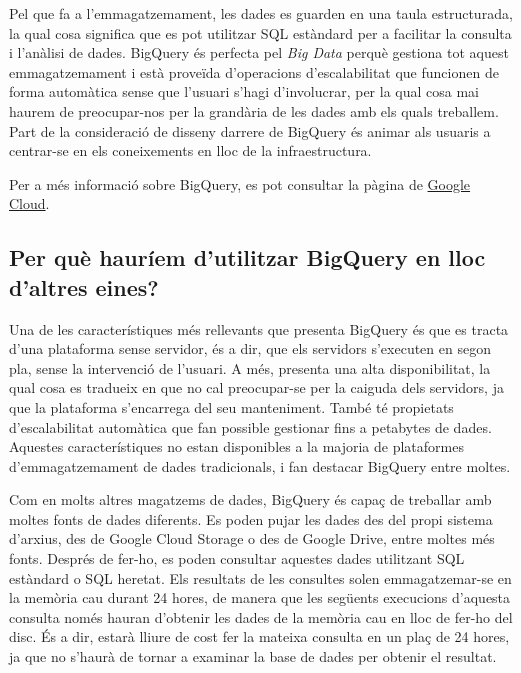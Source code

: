 \documentclass[12pt,longbibliography]{article}
\theoremstyle{definition}
\theoremstyle{remark}
\begin{document}
Pel que fa a l’emmagatzemament, les dades es guarden en una taula estructurada, la qual cosa significa que es pot utilitzar SQL estàndard per a facilitar la consulta i l’anàlisi de dades. BigQuery és perfecta pel \textit{Big Data} perquè gestiona tot aquest emmagatzemament i està proveïda d’operacions d’escalabilitat que funcionen de forma automàtica sense que l’usuari s’hagi d’involucrar,  per la qual cosa mai haurem de preocupar-nos per la grandària de les dades amb els quals treballem. Part de la consideració de disseny darrere de BigQuery és animar als usuaris a centrar-se en els coneixements en lloc de la infraestructura. 

\noindent
Per a més informació sobre BigQuery, es pot consultar la pàgina de \href{https://cloud.google.com/bigquery/docs/introduction}{Google Cloud}.

\subsection{Per què hauríem d'utilitzar BigQuery en lloc d'altres eines?}

Una de les característiques més rellevants que presenta BigQuery és que es tracta d'una plataforma sense servidor, és a dir, que els servidors s'executen en segon pla, sense la intervenció de l'usuari. A més, presenta una alta disponibilitat, la qual cosa es tradueix en que no cal preocupar-se per la caiguda dels servidors, ja que la plataforma s'encarrega del seu manteniment. També té propietats d'escalabilitat automàtica que fan possible gestionar fins a petabytes de dades. Aquestes característiques no estan disponibles a la majoria de plataformes d'emmagatzemament de dades tradicionals, i fan destacar BigQuery entre moltes.



Com en molts altres magatzems de dades, BigQuery és capaç de treballar amb moltes fonts de dades diferents. Es poden pujar les dades des del propi sistema d'arxius, des de Google Cloud Storage o des de Google Drive, entre moltes més fonts. Després de fer-ho, es poden consultar aquestes dades utilitzant SQL estàndard o SQL heretat. Els resultats de les consultes solen emmagatzemar-se en la memòria cau durant 24 hores, de manera que les següents execucions d'aquesta consulta només hauran d'obtenir les dades de la memòria cau en lloc de fer-ho del disc. És a dir, estarà lliure de cost fer la mateixa consulta en un plaç de 24 hores, ja que no s'haurà de tornar a examinar la base de dades per obtenir el resultat.
\end{document}
